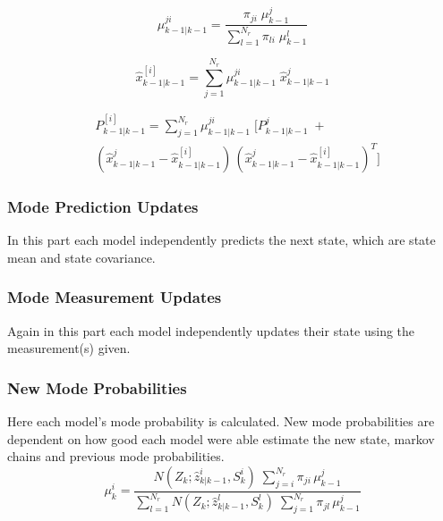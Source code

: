 \documentclass[peerreview]{IEEEtran}
\begin{document}
\begin{equation}
\mu_{k-1|k-1}^{ji} =
\frac
 {\pi_{ji} \; \mu_{k-1}^{j}}
 {\sum\limits_{l=1}^{N_{r}} \pi_{li} \; \mu_{k-1}^{l}}
\end{equation}

\begin{equation}
\hat{x}_{k-1|k-1}^{[i]} = \sum\limits_{j=1}^{N_{r}} \mu_{k-1|k-1}^{ji} \; \hat{x}_{k-1|k-1}^j
\end{equation}


\begin{equation}
\begin{aligned}
&P_{k-1|k-1}^{[i]} = \sum\limits_{j=1}^{N_{r}} \mu_{k-1|k-1}^{ji} \;  
[P_{k-1|k-1}^j \;+ \\ 
&( \hat{x}_{k-1|k-1}^j - \hat{x}_{k-1|k-1}^{[i]} ) \,
(\hat{x}_{k-1|k-1}^j - \hat{x}_{k-1|k-1}^{[i]})^T ]
\end{aligned}
\end{equation}



\vspace{10px}

\subsubsection{Mode Prediction Updates}
\vspace{10px}
In this part each model independently predicts the next state, which are state mean and state covariance.
\subsubsection{Mode Measurement Updates}
\vspace{10px}
Again in this part each model independently updates their state using the measurement(s) given.
\subsubsection{New Mode Probabilities}
\vspace{10px}
Here each model's mode probability is calculated. New mode probabilities are dependent on how good each model were able estimate the new state, markov chains and previous mode probabilities.
\begin{equation}
\mu_k^i = \frac
{N(Z_k; \hat{z}_{k|k-1}^i, S_k^i) \; \sum\limits_{j=i}^{N_r} \pi_{ji}\,\mu_{k-1}^j }
{\sum\limits_{l=1}^{N_r} N(Z_k; \hat{z}_{k|k-1}^l, S_k^l) \; \sum\limits_{j=1}^{N_r} \pi_{jl}\,\mu_{k-1} ^j }
\end{equation}
\end{document}
